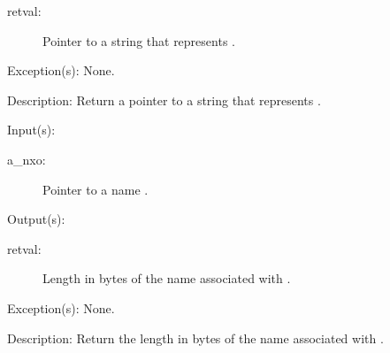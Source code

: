 \begin{capi}
\begin{capilist}
		\begin{description}\item[]
		\item[retval: ]
			Pointer to a string that represents .
		\end{description}
	\item[Exception(s): ] None.
	\item[Description: ]
		Return a pointer to a string that represents .
	\end{capilist}
\label{nxo_name_len_get}
	\begin{capilist}
	\item[Input(s): ]
		\begin{description}\item[]
		\item[a\_nxo: ]
			Pointer to a name .
		\end{description}
	\item[Output(s): ]
		\begin{description}\item[]
		\item[retval: ]
			Length in bytes of the name associated with
			.
		\end{description}
	\item[Exception(s): ] None.
	\item[Description: ]
		Return the length in bytes of the name associated with
		.
	\end{capilist}
\end{capi}
